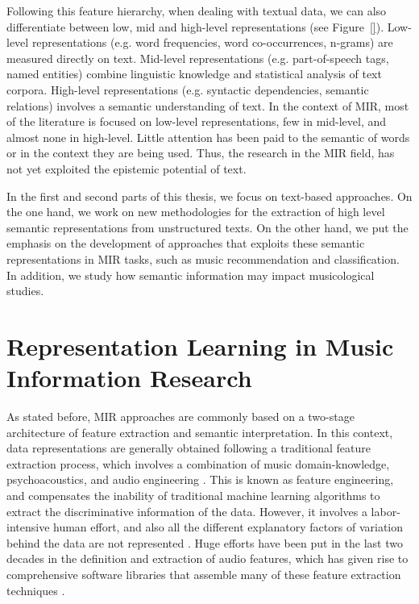 Following this feature hierarchy, when dealing with textual data, we can also differentiate between low, mid and high-level representations (see Figure~\ref{}). Low-level representations (e.g. word frequencies, word co-occurrences, n-grams) are measured directly on text. Mid-level representations (e.g. part-of-speech tags, named entities) combine linguistic knowledge and statistical analysis of text corpora. High-level representations (e.g. syntactic dependencies, semantic relations) involves a semantic understanding of text. In the context of MIR, most of the literature is focused on low-level representations, few in mid-level, and almost none in high-level. Little attention has been paid to the semantic of words or in the context they are being used. Thus, the research in the MIR field, has not yet exploited the epistemic potential of text.

In the first and second parts of this thesis, we focus on text-based approaches. On the one hand, we work on new methodologies for the extraction of high level semantic representations from unstructured texts. On the other hand, we put the emphasis on the development of approaches that exploits these semantic representations in MIR tasks, such as music recommendation and classification. In addition, we study how semantic information may impact musicological studies.

\section{Representation Learning in Music Information Research}
\label{sec:intro:learning}

As stated before, MIR approaches are commonly based on a two-stage architecture of feature extraction and semantic interpretation. In this context, data representations are generally obtained following a traditional feature extraction process, which involves a combination of music domain-knowledge, psychoacoustics, and audio engineering \citep{humphrey2012}. 
This is known as feature engineering, and compensates the inability of traditional machine learning algorithms to extract the discriminative information of the data. However, it involves a labor-intensive human effort, and also all the different explanatory factors of variation behind the data are not represented \citep{bengio2013representation}. 
Huge efforts have been put in the last two decades in the definition and extraction of audio features, which has given rise to comprehensive software libraries that assemble many of these feature extraction techniques \citep{bogdanov2013essentia, Mcfee2015}. 

